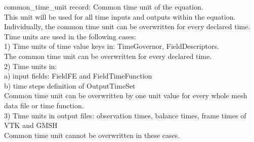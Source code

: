 \begin{RecordType}
			{common{\_}time{\_}unit}
			{{record: }}{}
			{ }
			{{{Common time unit of the equation.}\\{
This unit will be used for all time inputs and outputs within the equation.
Individually, the common time unit can be overwritten for every declared time.}\\{
Time units are used in the following cases:}\\{
1) Time units of time value keys in: TimeGovernor, FieldDescriptors.}\\{
   The common time unit can be overwritten for every declared time.}\\{
2) Time units in: }\\{
   a) input fields: FieldFE and FieldTimeFunction}\\{
   b) time steps definition of OutputTimeSet}\\{
   Common time unit can be overwritten by one unit value for every whole mesh data file or time function.}\\{
3) Time units in output files: observation times, balance times, frame times of VTK and GMSH}\\{
   Common time unit cannot be overwritten in these cases.}%
}}
\end{RecordType}
